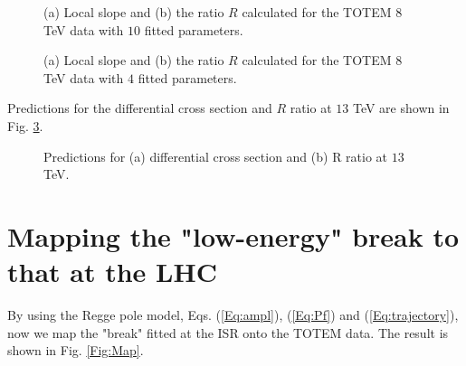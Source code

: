 \documentclass[aps,prd,superscriptaddress,showpacs,preprintnumbers]{revtex4}
\begin{document}
\begin{figure}[H] 
	\centering
	\quad
	
	\caption{(a) Local slope and (b) the ratio $R$ calculated for the TOTEM $8$ TeV data \cite{TOTEM8} with $10$ fitted parameters.}
	\label{LHC_slopeRa}
\end{figure}
\begin{figure}[H] 
	\centering
	\quad
	
	\caption{(a) Local slope and (b) the ratio $R$ calculated for the TOTEM $8$ TeV data \cite{TOTEM8} with $4$ fitted parameters.}
	\label{LHC_slopeRb}
\end{figure}

Predictions for the differential cross section and $R$ ratio at $13$ TeV are shown in Fig. \ref{Fig:Predict}.


\begin{figure}[H] 
	\centering
	\quad
	
	\caption{Predictions for (a) differential cross section and (b) R ratio at $13$ TeV.}
	\label{Fig:Predict}
\end{figure}
\section{Mapping the "low-energy" break to that at the LHC} \label{Extrapolate}
By using the Regge pole model, Eqs. (\ref{Eq:ampl}),  (\ref{Eq:Pf}) and (\ref{Eq:trajectory}), now we  map the "break" fitted at the ISR onto the TOTEM data. The result is shown in Fig. \ref{Fig:Map}.
\end{document}
